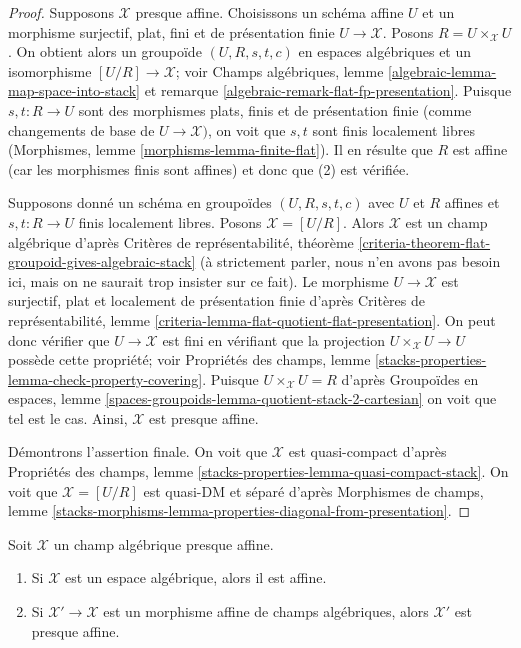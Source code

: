\begin{proof}
Supposons $\mathcal{X}$ presque affine. Choisissons un schéma affine $U$
et un morphisme surjectif, plat, fini et de présentation finie
$U \to \mathcal{X}$. Posons $R = U \times_\mathcal{X} U$. On
obtient alors un groupoïde $(U, R, s, t, c)$ en espaces algébriques et un
isomorphisme $[U/R] \to \mathcal{X}$; voir
Champs algébriques, lemme \ref{algebraic-lemma-map-space-into-stack}
et remarque \ref{algebraic-remark-flat-fp-presentation}.
Puisque $s, t : R \to U$ sont des morphismes
plats, finis et de présentation finie
(comme changements de base de $U \to \mathcal{X})$, on voit que
$s, t$ sont finis localement libres
(Morphismes, lemme \ref{morphisms-lemma-finite-flat}).
Il en résulte que $R$ est affine (car les morphismes finis sont affines)
et donc que (2) est vérifiée.

\medskip\noindent
Supposons donné un schéma en groupoïdes $(U, R, s, t, c)$ avec $U$ et
$R$ affines et $s, t : R \to U$ finis localement libres.
Posons $\mathcal{X} = [U/R]$. Alors $\mathcal{X}$ est un champ algébrique
d'après Critères de représentabilité, théorème
\ref{criteria-theorem-flat-groupoid-gives-algebraic-stack} (à strictement parler,
nous n'en avons pas besoin ici, mais on ne saurait trop insister sur ce fait).
Le morphisme $U \to \mathcal{X}$ est surjectif, plat et localement
de présentation finie d'après
Critères de représentabilité, lemme
\ref{criteria-lemma-flat-quotient-flat-presentation}.
On peut donc vérifier que $U \to \mathcal{X}$ est fini en
vérifiant que la projection $U \times_\mathcal{X} U \to U$
possède cette propriété; voir Propriétés des champs, lemme
\ref{stacks-properties-lemma-check-property-covering}.
Puisque $U \times_\mathcal{X} U = R$ d'après
Groupoïdes en espaces, lemme
\ref{spaces-groupoids-lemma-quotient-stack-2-cartesian}
on voit que tel est le cas. Ainsi, $\mathcal{X}$ est presque affine.

\medskip\noindent
Démontrons l'assertion finale. On voit que $\mathcal{X}$
est quasi-compact d'après Propriétés des champs, lemme
\ref{stacks-properties-lemma-quasi-compact-stack}.
On voit que $\mathcal{X} = [U/R]$ est quasi-DM et séparé d'après
Morphismes de champs, lemme
\ref{stacks-morphisms-lemma-properties-diagonal-from-presentation}.
\end{proof}

\begin{lemma}
\label{lemma-affine-over-well-nigh-affine}
Soit $\mathcal{X}$ un champ algébrique presque affine.
\begin{enumerate}
\item Si $\mathcal{X}$ est un espace algébrique, alors il est affine.
\item Si $\mathcal{X}' \to \mathcal{X}$ est un morphisme affine
de champs algébriques, alors $\mathcal{X}'$ est presque affine.
\end{enumerate}
\end{lemma}

